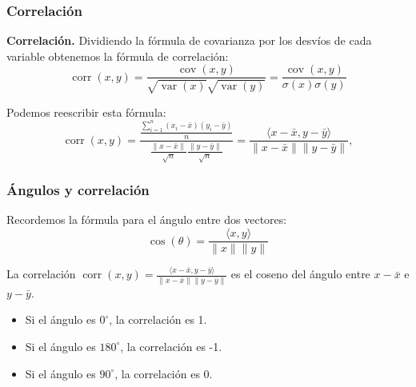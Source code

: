 \documentclass[aspectratio=169,12pt]{beamer}
\DeclareMathOperator{\var}{var}
\DeclareMathOperator{\cov}{cov}
\DeclareMathOperator{\corr}{corr}
\begin{document}
\begin{frame}
    \frametitle{Correlación}

\textbf{Correlaci\'on.} Dividiendo la fórmula de covarianza por los desvíos de cada variable obtenemos la fórmula de correlación:
$$
\corr(x,y) = \frac{\cov(x, y)}{\sqrt{\var(x)}\sqrt{\var(y)}} = \frac{\cov(x, y)}{\sigma(x)\sigma(y)}
$$

Podemos reescribir esta fórmula:
$$
\corr(x,y) = \frac{\frac{\sum_{i = 1}^n (x_i - \bar x)(y_i - \bar y)}{n}}{\frac{\|x  - \bar x\|}{\sqrt{n}}\frac{\|y - \bar y\|}{\sqrt{n}}} = \frac{\langle x - \bar x, y - \bar y\rangle}{\|x - \bar x\|\|y  - \bar y\|},
$$

\end{frame}

\begin{frame}
    \frametitle{\'Angulos y correlación}

\begin{minipage}{.45\textwidth}
Recordemos la fórmula para el ángulo entre dos vectores:
$$
\cos(\theta) = \frac{\langle x, y \rangle}{\|x\|\|y\|}
$$
\end{minipage} \hspace{.4cm} %
\begin{minipage}{.45\textwidth}
\end{minipage}

La correlación $\corr(x, y) = \frac{\langle x - \bar x, y - \bar y \rangle}{\|x - \bar x\|\|y - \bar y\|}$ es el coseno del ángulo entre $x - \bar x$ e $y - \bar y$. 

\begin{itemize}
\item Si el ángulo es $0^\circ$, la correlación es 1.
\item Si el ángulo es $180^\circ$, la correlación es -1.
\item Si el ángulo es $90^\circ$, la correlación es 0.
\end{itemize}

\end{frame}
\end{document}
